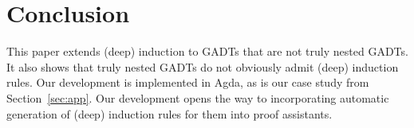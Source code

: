 \documentclass[sigplan,10pt]{acmart}
\begin{document}
\section{Conclusion}\label{sec:conclusion}

This paper extends (deep) induction to GADTs that are not truly nested
GADTs. It also shows that truly nested GADTs do not obviously admit
(deep) induction rules. Our development is implemented in Agda, as is
our case study from Section~\ref{sec:app}. Our development opens the
way to incorporating automatic generation of (deep) induction rules
for them into proof assistants.



\end{document}
